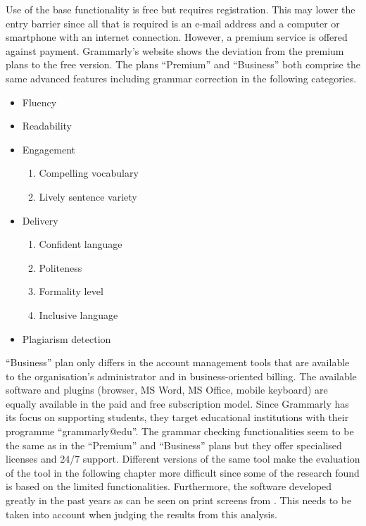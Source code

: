 \documentclass[runningheads]{llncs}
\let\OldTextregistered\textregistered
\renewcommand{\textregistered}{\OldTextregistered\xspace}
\begin{document}
Use of the base functionality is free but requires registration. This may lower the entry barrier since all that is required is an e-mail address and a computer or smartphone with an internet connection. However, a premium service is offered against payment. Grammarly\textregistered's website \citep{noauthor_grammarly_nodate} shows the deviation from the premium plans to the free version. The plans ``Premium'' and ``Business'' both comprise the same advanced features including grammar correction in the following categories.
\begin{itemize}
 \item Fluency
 \item Readability
 \item Engagement
 \begin{enumerate}
  \item Compelling vocabulary
  \item Lively sentence variety
 \end{enumerate}
 \item Delivery
 \begin{enumerate}
  \item Confident language
  \item Politeness
  \item Formality level
  \item Inclusive language
 \end{enumerate}
 \item Plagiarism detection
\end{itemize}
``Business'' plan only differs in the account management tools that are available to the organisation's administrator and in business-oriented billing. The available software and plugins (browser, MS Word, MS Office, mobile keyboard) are equally available in the paid and free subscription model. Since Grammarly\textregistered has its focus on supporting students, they target educational institutions with their programme ``grammarly@edu''. The grammar checking functionalities seem to be the same as in the ``Premium'' and ``Business'' plans but they offer specialised licenses and 24/7 support. Different versions of the same tool make the evaluation of the tool in the following chapter more difficult since some of the research found is based on the limited functionalities. Furthermore, the software developed greatly in the past years as can be seen on print screens from \textcite{dembsey_closing_2017}. This needs to be taken into account when judging the results from this analysis.
\end{document}
